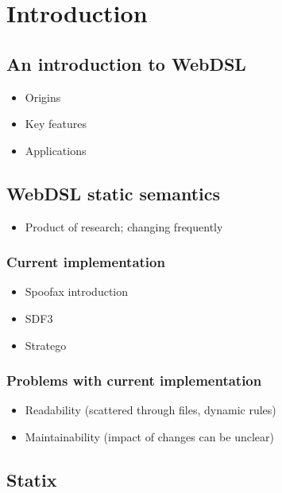 
\chapter{\label{chap:introduction}Introduction}

\section{An introduction to WebDSL}

  \begin{itemize}
    \item Origins
    \item Key features
    \item Applications
  \end{itemize}

\section{WebDSL static semantics}

  \begin{itemize}
    \item Product of research; changing frequently
  \end{itemize}

  \subsection{Current implementation}

    \begin{itemize}
      \item Spoofax introduction
      \item SDF3
      \item Stratego
    \end{itemize}

  \subsection{Problems with current implementation}

    \begin{itemize}
      \item Readability (scattered through files, dynamic rules)
      \item Maintainability (impact of changes can be unclear)
    \end{itemize}

\section{Statix}

